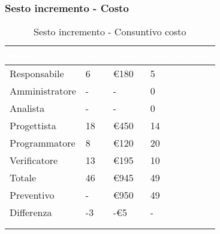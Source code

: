 {{            \subsubsection{Sesto incremento - Costo} {
                \setlength{\freewidth}{\dimexpr\textwidth-30\tabcolsep}
                \renewcommand{\arraystretch}{1.0}
                \centering
                \setlength{\aboverulesep}{0pt}
                \setlength{\belowrulesep}{0pt}
                \begin{longtable}{C{.4\freewidth} C{.2\freewidth} C{.2\freewidth} C{.2\freewidth}}
                \toprule
                \textcolor{white}{\textbf{Ruolo}}&
                \textcolor{white}{\textbf{Ore}}&
                \textcolor{white}{\textbf{Costo}}&
                \textcolor{white}{\textbf{Ore previste}}\\
                \toprule
                \endhead
          
                Responsabile & 6 & \euro180 & 5 \\
                Amministratore & - & - & 0 \\
                Analista & - & - & 0 \\
                Progettista & 18 & \euro450 & 14 \\
                Programmatore & 8 & \euro120 & 20 \\
                Verificatore & 13 & \euro195 & 10\\
                Totale & 46 & \euro945 & 49\\
                Preventivo & - & \euro950 & 49 \\
                Differenza & -3 & -\euro5 & -\\
                \bottomrule
                \\
                \caption{Sesto incremento - Consuntivo costo}
          
                \end{longtable}

}}}
